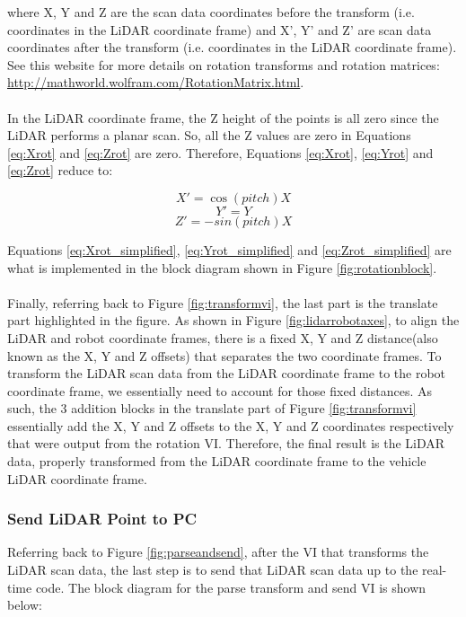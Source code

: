\noindent where X, Y  and Z are the scan data coordinates before the transform (i.e. coordinates in the LiDAR coordinate frame) and X', Y' and Z' are scan data coordinates after the transform (i.e. coordinates in the LiDAR coordinate frame). See this website for more details on rotation transforms and rotation matrices: \url{http://mathworld.wolfram.com/RotationMatrix.html}. \\ \\
%
In the LiDAR coordinate frame, the Z height of the points is all zero since the LiDAR performs a planar scan. So, all the Z values are zero in Equations \ref{eq:Xrot} and \ref{eq:Zrot} are zero. Therefore, Equations \ref{eq:Xrot}, \ref{eq:Yrot} and \ref{eq:Zrot} reduce to:

\begin{equation}
X'=\cos(pitch)X
\label{eq:Xrot_simplified}
\end{equation}
\begin{equation}
Y'=Y
\label{eq:Yrot_simplified}
\end{equation}
\begin{equation}
Z'=- sin(pitch)X
\label{eq:Zrot_simplified}
\end{equation}

\noindent Equations \ref{eq:Xrot_simplified}, \ref{eq:Yrot_simplified} and \ref{eq:Zrot_simplified} are what is implemented in the block diagram shown in Figure \ref{fig:rotationblock}.\\ \\
%
Finally, referring back to Figure \ref{fig:transformvi}, the last part is the translate part highlighted in the figure. As shown in Figure \ref{fig:lidarrobotaxes}, to align the LiDAR and robot coordinate frames, there is a fixed X, Y and Z distance(also known as the X, Y and Z offsets) that separates the two coordinate frames. To transform the LiDAR scan data from the LiDAR coordinate frame to the robot coordinate frame, we essentially need to account for those fixed distances. As such, the 3 addition blocks in the translate part of Figure \ref{fig:transformvi} essentially add the X, Y and Z offsets to the X, Y and Z coordinates respectively that were output from the rotation VI. Therefore, the final result is the LiDAR data, properly transformed from the LiDAR coordinate frame to the vehicle LiDAR coordinate frame.

\subsubsection{Send LiDAR Point to PC}
Referring back to Figure \ref{fig:parseandsend}, after the VI that transforms the LiDAR scan data, the last step is to send that LiDAR scan data up to the real-time code. The block diagram for the parse transform and send VI is shown below:

